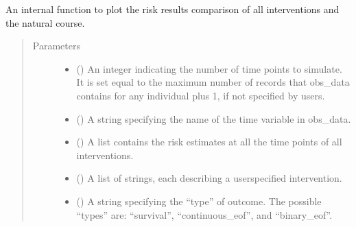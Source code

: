 \documentclass[letterpaper,10pt,english]{sphinxmanual}
\begin{document}
\begin{fulllineitems}
\label{\detokenize{Specifications/Output:pygformula.plot.plot_interventions}}
\sphinxAtStartPar
An internal function to plot the risk results comparison of all interventions and the natural course.
\begin{quote}\begin{description}
\item[{Parameters}] \leavevmode\begin{itemize}
\item {} 
\sphinxAtStartPar
{} () \textendash{} An integer indicating the number of time points to simulate. It is set equal to the maximum number of records
that obs\_data contains for any individual plus 1, if not specified by users.

\item {} 
\sphinxAtStartPar
{} () \textendash{} A string specifying the name of the time variable in obs\_data.

\item {} 
\sphinxAtStartPar
{} () \textendash{} A list contains the risk estimates at all the time points of all interventions.

\item {} 
\sphinxAtStartPar
{} () \textendash{} A list of strings, each describing a user\sphinxhyphen{}specified intervention.

\item {} 
\sphinxAtStartPar
{} () \textendash{} A string specifying the “type” of outcome. The possible “types” are: “survival”, “continuous\_eof”, and “binary\_eof”.


\end{itemize}
\end{description}
\end{quote}
\end{fulllineitems}
\end{document}
